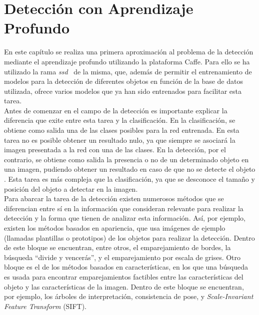 \chapter{Detección con Aprendizaje Profundo}\label{cap.deteccion}
En este capítulo se realiza una primera aproximación al problema de la detección mediante el aprendizaje profundo utilizando la plataforma Caffe. Para ello se ha utilizado la rama \textit{\acrfull{ssd}}~\cite{liu2016ssd} de la misma, que, además de permitir el entrenamiento de modelos para la detección de diferentes objetos en función de la base de datos utilizada, ofrece varios modelos que ya han sido entrenados para facilitar esta tarea.\\

Antes de comenzar en el campo de la detección es importante explicar la diferencia que exite entre esta tarea y la clasificación. En la clasificación, se obtiene como salida una de las clases posibles para la red entrenada. En esta tarea no es posible obtener un resultado nulo, ya que siempre se asociará la imagen presentada a la red con una de las clases. En la detección, por el contrario, se obtiene como salida la presencia o no de un determinado objeto en una imagen, pudiendo obtener un resultado en caso de que no se detecte el objeto . Esta tarea es más compleja que la clasificación, ya que se desconoce el tamaño y posición del objeto a detectar en la imagen.\\

Para abarcar la tarea de la detección existen numerosos métodos que se diferencian entre sí en la información que consideran relevante para realizar la detección y la forma que tienen de analizar esta información. Así, por ejemplo, existen los métodos basados en apariencia, que usa imágenes de ejemplo (llamadas plantillas o prototipos) de los objetos para realizar la detección. Dentro de este bloque se encuentran, entre otros, el emparejamiento de bordes, la búsqueda ``divide y vencerás'', y el emparejamiento  por escala de grises. Otro bloque es el de los métodos basados en características, en los que una búsqueda es usada para encontrar emparejamientos factibles entre las características del objeto y las características de la imagen. Dentro de este bloque se encuentran, por ejemplo, los árboles de interpretación,  consistencia de pose, y  \textit{Scale-Invariant Feature Transform} (SIFT).

